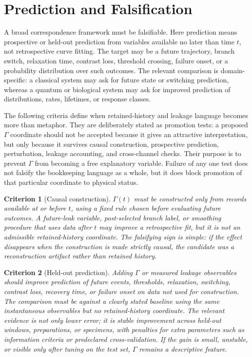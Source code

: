 \documentclass[11pt,a4paper]{article}
\newtheorem{criterion}{Criterion}
\newcommand{\Ghist}{\Gamma}
\begin{document}
\section{Prediction and Falsification}
A broad correspondence framework must be falsifiable.  Here prediction means prospective or held-out prediction from variables available no later than time \(t\), not retrospective curve fitting.  The target may be a future trajectory, branch switch, relaxation time, contrast loss, threshold crossing, failure onset, or a probability distribution over such outcomes.  The relevant comparison is domain-specific: a classical system may ask for future state or switching prediction, whereas a quantum or biological system may ask for improved prediction of distributions, rates, lifetimes, or response classes.

The following criteria define when retained-history and leakage language becomes more than metaphor.  They are deliberately stated as promotion tests: a proposed \(\Ghist\) coordinate should not be accepted because it gives an attractive interpretation, but only because it survives causal construction, prospective prediction, perturbation, leakage accounting, and cross-channel checks.  Their purpose is to prevent \(\Ghist\) from becoming a free explanatory variable.  Failure of any one test does not falsify the bookkeeping language as a whole, but it does block promotion of that particular coordinate to physical status.

\begin{criterion}[Causal construction]
\(\Ghist(t)\) must be constructed only from records available at or before \(t\), using a fixed rule chosen before evaluating future outcomes.  A future-leak variable, post-selected branch label, or smoothing procedure that uses data after \(t\) may improve a retrospective fit, but it is not an admissible retained-history coordinate.  The falsifying sign is simple: if the effect disappears when the construction is made strictly causal, the candidate was a reconstruction artifact rather than retained history.
\end{criterion}

\begin{criterion}[Held-out prediction]
Adding \(\Ghist\) or measured leakage observables should improve prediction of future events, thresholds, relaxation, switching, contrast loss, recovery time, or failure onset on data not used for construction.  The comparison must be against a clearly stated baseline using the same instantaneous observables but no retained-history coordinate.  The relevant evidence is not only lower error; it is stable improvement across held-out windows, preparations, or specimens, with penalties for extra parameters such as information criteria or predeclared cross-validation.  If the gain is small, unstable, or visible only after tuning on the test set, \(\Ghist\) remains a descriptive feature.
\end{criterion}
\end{document}
